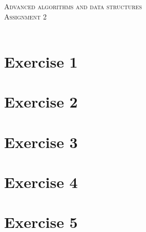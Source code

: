\documentclass{article}
\begin{document}
\begin{center}
\textsc{\Large Advanced algorithms and data structures}\\[0.5cm]
\textsc{\large Assignment 2}\\[0.5cm]
\textsc{\large }\\[0.5cm]
\vspace{1 cm}
\end{center}

\section*{Exercise 1}


\newpage
\section*{Exercise 2}

\section*{Exercise 3}


\newpage
\section*{Exercise 4}



\newpage
\section*{Exercise 5}
\end{document}
